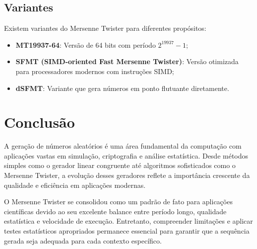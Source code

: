 \documentclass[12pt,a4paper]{article}
\begin{document}
\subsection{Variantes}

Existem variantes do Mersenne Twister para diferentes propósitos:

\begin{itemize}
    \item \textbf{MT19937-64}: Versão de 64 bits com período $2^{19937} - 1$;
    \item \textbf{SFMT (SIMD-oriented Fast Mersenne Twister)}: Versão otimizada para processadores modernos com instruções SIMD;
    \item \textbf{dSFMT}: Variante que gera números em ponto flutuante diretamente.
\end{itemize}

\newpage

\section{Conclusão}

A geração de números aleatórios é uma área fundamental da computação com aplicações vastas em simulação, criptografia e análise estatística. Desde métodos simples como o gerador linear congruente até algoritmos sofisticados como o Mersenne Twister, a evolução desses geradores reflete a importância crescente da qualidade e eficiência em aplicações modernas.

O Mersenne Twister se consolidou como um padrão de fato para aplicações científicas devido ao seu excelente balance entre período longo, qualidade estatística e velocidade de execução. Entretanto, compreender limitações e aplicar testes estatísticos apropriados permanece essencial para garantir que a sequência gerada seja adequada para cada contexto específico.

\newpage
\end{document}
